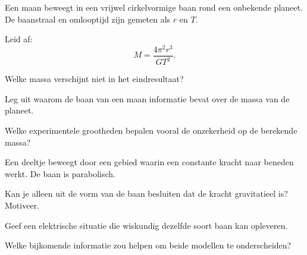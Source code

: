 \documentclass{ximera}
\begin{document}
\begin{oefening}{\oefG}

Een maan beweegt in een vrijwel cirkelvormige baan rond een onbekende
planeet. De baanstraal en omlooptijd zijn gemeten als $r$ en $T$.

\begin{question}
Leid af:
\[
\boxed{
M=\frac{4\pi^2r^3}{GT^2}.
}
\]
\end{question}

\begin{question}
Welke massa verschijnt niet in het eindresultaat?
\end{question}

\begin{question}
Leg uit waarom de baan van een maan informatie bevat over de massa van
de planeet.
\end{question}

\begin{question}
Welke experimentele grootheden bepalen vooral de onzekerheid op de
berekende massa?
\end{question}

\end{oefening}


\begin{oefening}{\oefU}

Een deeltje beweegt door een gebied waarin een constante kracht naar
beneden werkt. De baan is parabolisch.

\begin{question}
Kan je alleen uit de vorm van de baan besluiten dat de kracht
gravitatieel is? Motiveer.
\end{question}

\begin{question}
Geef een elektrische situatie die wiskundig dezelfde soort baan kan
opleveren.
\end{question}

\begin{question}
Welke bijkomende informatie zou helpen om beide modellen te
onderscheiden?
\end{question}

\end{oefening}
\end{document}
